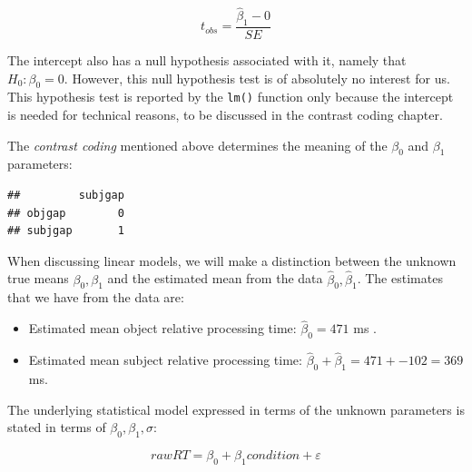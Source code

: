 \documentclass[
  12pt,
]{krantz}
\newenvironment{Shaded}{\begin{snugshade}}{\end{snugshade}}
\newcommand{\AttributeTok}[1]{\textcolor[rgb]{0.77,0.63,0.00}{#1}}
\newcommand{\FunctionTok}[1]{\textcolor[rgb]{0.00,0.00,0.00}{#1}}
\newcommand{\NormalTok}[1]{#1}
\newcommand{\OtherTok}[1]{\textcolor[rgb]{0.56,0.35,0.01}{#1}}
\newcommand{\SpecialCharTok}[1]{\textcolor[rgb]{0.00,0.00,0.00}{#1}}
\newcommand{\StringTok}[1]{\textcolor[rgb]{0.31,0.60,0.02}{#1}}
\providecommand{\tightlist}{%
  \setlength{\itemsep}{0pt}\setlength{\parskip}{0pt}}
\theoremstyle{definition}
\theoremstyle{definition}
\theoremstyle{definition}
\theoremstyle{definition}
\theoremstyle{remark}
\begin{document}
\begin{equation}
t_{obs} = \frac{\hat\beta_1 - 0}{SE}
\end{equation}

The intercept also has a null hypothesis associated with it, namely that
\(H_0: \beta_0 = 0\). However, this null hypothesis test is of absolutely no interest for us. This hypothesis test is reported by the \texttt{lm()} function only because the intercept is needed for technical reasons, to be discussed in the contrast coding chapter.

The \emph{contrast coding} mentioned above determines the meaning of the \(\beta_0\) and \(\beta_1\) parameters:

\begin{Shaded}
\end{Shaded}

\begin{verbatim}
##         subjgap
## objgap        0
## subjgap       1
\end{verbatim}

When discussing linear models, we will make a distinction between the unknown true means \(\beta_0, \beta_1\) and the estimated mean from the data \(\hat\beta_0, \hat\beta_1\). The estimates that we have from the data are:

\begin{itemize}
\tightlist
\item
  Estimated mean object relative processing time: \(\hat\beta_0=471\) ms
  .
\item
  Estimated mean subject relative processing time: \(\hat\beta_0+\hat\beta_1=471+-102=369\) ms.
\end{itemize}

The underlying statistical model expressed in terms of the unknown parameters is stated in terms of \(\beta_0, \beta_1, \sigma\):

\begin{equation}
rawRT = \beta_0 + \beta_1 condition + \varepsilon
\end{equation}
\end{document}
